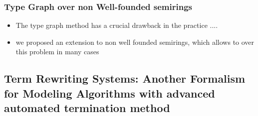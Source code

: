 \subsubsection*{Type Graph over non Well-founded semirings}
\begin{itemize}
    \item The type graph method has a crucial drawback in the practice ....
    \item we proposed an extension to non well founded semirings, which allows to over this problem in many cases
\end{itemize}

\subsection*{Term Rewriting Systems: Another Formalism for Modeling Algorithms with advanced automated termination method}


